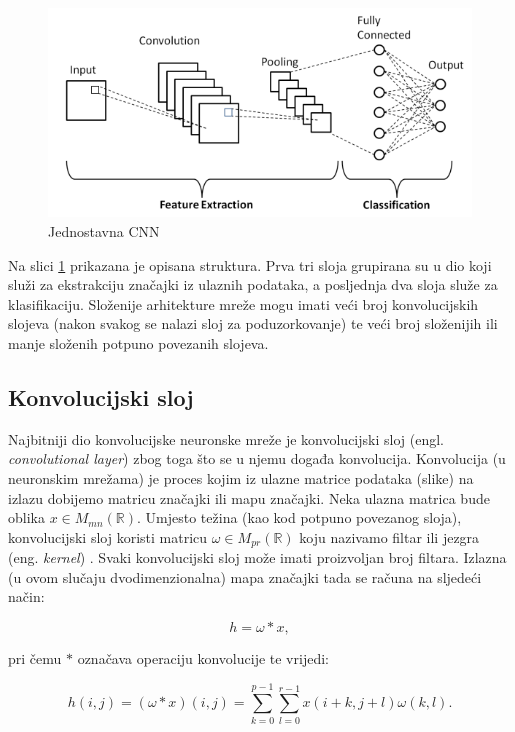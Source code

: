 \begin{figure}[htb]
    \centering
    \includegraphics[width=0.5\linewidth]{Chapters/neuronska_mreza/CNN/cnn.png} 
    \caption{Jednostavna CNN \cite{1}}
    \label{pic:cnn}
\end{figure}

Na slici \ref{pic:cnn} prikazana je opisana struktura. Prva tri sloja grupirana su
u dio koji služi za ekstrakciju značajki iz ulaznih podataka, a posljednja dva
sloja služe za klasifikaciju. Složenije arhitekture mreže mogu imati veći broj
konvolucijskih slojeva (nakon svakog se nalazi sloj za poduzorkovanje) te veći broj
složenijih ili manje složenih potpuno povezanih slojeva.

\subsection{Konvolucijski sloj}
\label{sub:conv}

Najbitniji dio konvolucijske neuronske mreže je konvolucijski sloj 
(engl. \textit{convolutional layer}) zbog toga što se
u njemu događa konvolucija. Konvolucija (u neuronskim mrežama) je proces kojim 
iz ulazne matrice podataka (slike) na izlazu dobijemo matricu značajki ili
mapu značajki. Neka ulazna matrica bude oblika \( x \in M_{mn}(\mathbb{R}) \).
Umjesto težina (kao kod potpuno povezanog sloja), konvolucijski sloj koristi
matricu \( \omega \in M_{pr}(\mathbb{R}) \) koju nazivamo filtar ili
jezgra (eng. \textit{kernel}) \cite{keras_layers}. Svaki konvolucijski 
sloj može imati proizvoljan broj filtara. Izlazna (u ovom slučaju dvodimenzionalna)
mapa značajki tada se računa na sljedeći način:

\begin{equation}
h = \omega * x,
\end{equation}

pri čemu \( * \) označava operaciju konvolucije te vrijedi:

\begin{equation}
h(i, j) = (\omega * x)(i, j) = 
\sum_{k=0}^{p-1} \sum_{l=0}^{r-1} x(i + k, j + l) \omega(k, l).
\end{equation}

